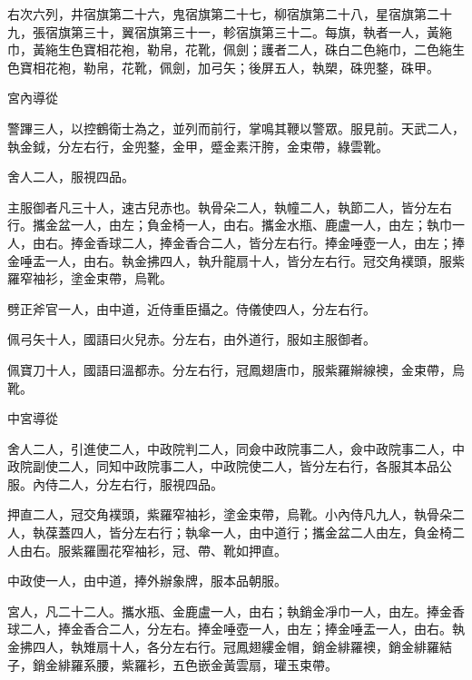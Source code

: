 \begin{pinyinscope}
 右次六列，井宿旗第二十六，鬼宿旗第二十七，柳宿旗第二十八，星宿旗第二十九，張宿旗第三十，翼宿旗第三十一，軫宿旗第三十二。每旗，執者一人，黃絁巾，黃絁生色寶相花袍，勒帛，花靴，佩劍；護者二人，硃白二色絁巾，二色絁生色寶相花袍，勒帛，花靴，佩劍，加弓矢；後屏五人，執槊，硃兜鍪，硃甲。



 宮內導從



 警蹕三人，以控鶴衛士為之，並列而前行，掌鳴其鞭以警眾。服見前。天武二人，執金鉞，分左右行，金兜鍪，金甲，蹙金素汗胯，金束帶，綠雲靴。



 舍人二人，服視四品。



 主服御者凡三十人，速古兒赤也。執骨朵二人，執幢二人，執節二人，皆分左右行。攜金盆一人，由左；負金椅一人，由右。攜金水瓶、鹿盧一人，由左；執巾一人，由右。捧金香球二人，捧金香合二人，皆分左右行。捧金唾壺一人，由左；捧金唾盂一人，由右。執金拂四人，執升龍扇十人，皆分左右行。冠交角襆頭，服紫羅窄袖衫，塗金束帶，烏靴。



 劈正斧官一人，由中道，近侍重臣攝之。侍儀使四人，分左右行。



 佩弓矢十人，國語曰火兒赤。分左右，由外道行，服如主服御者。



 佩寶刀十人，國語曰溫都赤。分左右行，冠鳳翅唐巾，服紫羅辮線襖，金束帶，烏靴。



 中宮導從



 舍人二人，引進使二人，中政院判二人，同僉中政院事二人，僉中政院事二人，中政院副使二人，同知中政院事二人，中政院使二人，皆分左右行，各服其本品公服。內侍二人，分左右行，服視四品。



 押直二人，冠交角襆頭，紫羅窄袖衫，塗金束帶，烏靴。小內侍凡九人，執骨朵二人，執葆蓋四人，皆分左右行；執傘一人，由中道行；攜金盆二人由左，負金椅二人由右。服紫羅團花窄袖衫，冠、帶、靴如押直。



 中政使一人，由中道，捧外辦象牌，服本品朝服。



 宮人，凡二十二人。攜水瓶、金鹿盧一人，由右；執銷金凈巾一人，由左。捧金香球二人，捧金香合二人，分左右。捧金唾壺一人，由左；捧金唾盂一人，由右。執金拂四人，執雉扇十人，各分左右行。冠鳳翅縷金帽，銷金緋羅襖，銷金緋羅結子，銷金緋羅系腰，紫羅衫，五色嵌金黃雲扇，瓘玉束帶。




\end{pinyinscope}
